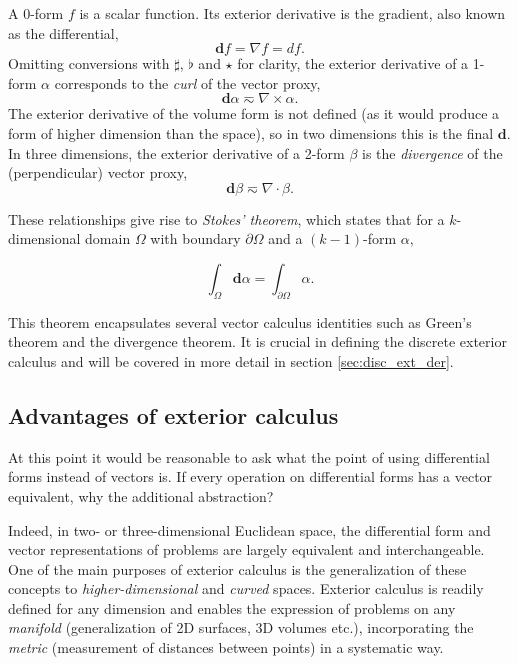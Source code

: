 \documentclass[utf8,english]{gradu3}
\begin{document}
A 0-form $f$ is a scalar function.
Its exterior derivative is the gradient, also known as the differential,
\[
  \mathbf{d}f = \nabla f = df.
\]
Omitting conversions with $\sharp$, $\flat$ and $\star$ for clarity,
the exterior derivative of a 1-form $\alpha$ corresponds to the
\textit{curl} of the vector proxy,
\[
  \mathbf{d}\alpha \eqsim \nabla \times \alpha.
\]
The exterior derivative of the volume form is not defined
(as it would produce a form of higher dimension than the space),
so in two dimensions this is the final $\mathbf{d}$.
In three dimensions, the exterior derivative of a 2-form $\beta$
is the \textit{divergence} of the (perpendicular) vector proxy,
\[
  \mathbf{d}\beta \eqsim \nabla \cdot \beta.
\]

These relationships give rise to \textit{Stokes' theorem},
which states that for a $k$-dimensional domain $\Omega$
with boundary $\partial \Omega$ and a $(k-1)$-form $\alpha$,

\begin{equation}\label{eq:stokes_theorem}
  \int_{\Omega} \mathbf{d}\alpha = \int_{\partial\Omega} \alpha.
\end{equation}

This theorem encapsulates several vector calculus identities
such as Green's theorem and the divergence theorem.
It is crucial in defining the discrete exterior calculus
and will be covered in more detail in section \ref{sec:disc_ext_der}.

\subsection{Advantages of exterior calculus}

At this point it would be reasonable to ask what the point of
using differential forms instead of vectors is.
If every operation on differential forms has a vector equivalent,
why the additional abstraction?

Indeed, in two- or three-dimensional Euclidean space,
the differential form and vector representations of problems
are largely equivalent and interchangeable.
One of the main purposes of exterior calculus
is the generalization of these concepts to \textit{higher-dimensional}
and \textit{curved} spaces.
Exterior calculus is readily defined for any dimension
and enables the expression of problems on any \textit{manifold}
(generalization of 2D surfaces, 3D volumes etc.),
incorporating the \textit{metric} (measurement of distances between points)
in a systematic way.
\end{document}
